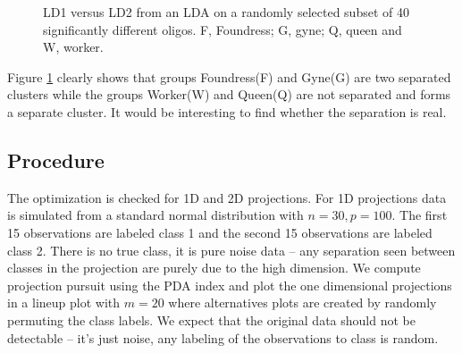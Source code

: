 \documentclass[12]{report}
\begin{document}
\begin{figure}[hbtp]
   \centering
       \caption{LD1 versus LD2 from an LDA on a randomly selected subset of 40 significantly different oligos. F, Foundress; G, gyne; Q, queen and W, worker.}
     \label{oligo}
\end{figure}  

Figure \ref{oligo} clearly shows that groups Foundress(F) and Gyne(G) are two separated clusters while the groups Worker(W) and Queen(Q) are not separated and forms a separate cluster. It would be interesting to find whether the separation is real.

\subsection{Procedure}

The optimization is checked for 1D and 2D projections. For 1D projections data is simulated from a standard normal distribution with $n=30, p=100$. The first 15 observations are labeled class 1 and the second 15 observations are labeled class 2. There is no true class, it is pure noise data -- any separation seen between classes in the projection are purely due to the high dimension. We compute projection pursuit using the PDA index and plot the one dimensional projections in a lineup plot with $m=20$ where alternatives plots are created by randomly permuting the class labels. We expect that the original data should not be detectable -- it's just noise, any labeling of the observations to class is random. 
\end{document}
